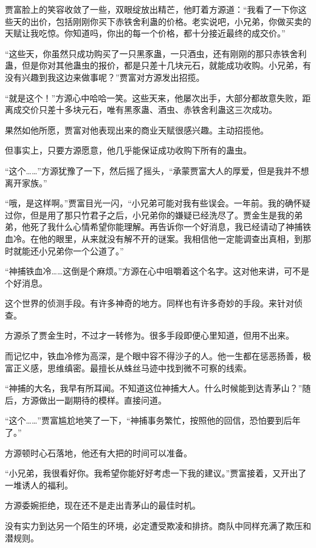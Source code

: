 \begin{this_body}
贾富脸上的笑容收敛了一些，双眼绽放出精芒，他盯着方源道：“我看了一下你这些天的出价，包括刚刚你买下赤铁舍利蛊的价格。老实说吧，小兄弟，你做买卖的天赋让我吃惊。你知道吗，你出的每一个价格，都十分接近最终的成交价。”

“这些天，你虽然只成功购买了一只黑豕蛊，一只酒虫，还有刚刚的那只赤铁舍利蛊，但是你对其他蛊虫的报价，都是只差十几块元石，就能成功收购。小兄弟，有没有兴趣到我这边来做事呢？”贾富对方源发出招揽。

“就是这个！”方源心中哈哈一笑。这些天来，他屡次出手，大部分都故意失败，距离成交价只差十多块元石，唯有黑豕蛊、酒虫、赤铁舍利蛊这三次成功。

果然如他所愿，贾富对他表现出来的商业天赋很感兴趣。主动招揽他。

但事实上，只要方源愿意，他几乎能保证成功收购下所有的蛊虫。

“这个……”方源犹豫了一下，然后摇了摇头，“承蒙贾富大人的厚爱，但是我并不想离开家族。”

“哦，是这样啊。”贾富目光一闪，“小兄弟可能对我有些误会。一年前。我的确怀疑过你，但是用了那只竹君子之后，小兄弟你的嫌疑已经洗尽了。贾金生是我的弟弟，他死了我什么心情希望你能理解。再告诉你一个好消息，我已经请动了神捕铁血冷。在他的眼里，从来就没有解不开的谜案。我相信他一定能调查出真相，到那时就能还小兄弟你一个公道了。”

“神捕铁血冷……这倒是个麻烦。”方源在心中咀嚼着这个名字。这对他来讲，可不是个好消息。

这个世界的侦测手段。有许多神奇的地方。同样也有许多奇妙的手段。来针对侦查。

方源杀了贾金生时，不过才一转修为。很多手段即便心里知道，但用不出来。

而记忆中，铁血冷修为高深，是个眼中容不得沙子的人。他一生都在惩恶扬善，极富正义感，思维缜密。最擅长从蛛丝马迹中找到微不可察的线索。

“神捕的大名，我早有所耳闻。不知道这位神捕大人。什么时候能到达青茅山？”随后，方源做出一副期待的模样。直接问道。

“这个……”贾富尴尬地笑了一下，“神捕事务繁忙，按照他的回信，恐怕要到后年了。”

方源顿时心石落地，他还有大把的时间可以准备。

“小兄弟，我很看好你。我希望你能好好考虑一下我的建议。”贾富接着，又开出了一堆诱人的福利。

方源委婉拒绝，现在还不是走出青茅山的最佳时机。

没有实力到达另一个陌生的环境，必定遭受欺凌和排挤。商队中同样充满了欺压和潜规则。


\end{this_body}
